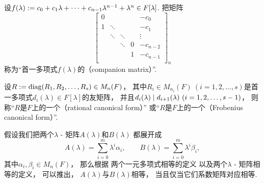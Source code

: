 \begin{definition}
设\(
	f(\lambda)
	\defeq
	c_0 + c_1 \lambda + \dotsb + c_{n-1} \lambda^{n-1} + \lambda^n
	\in F[\lambda]
\).
把矩阵\begin{equation*}
	\begin{bmatrix}
		0 &        &        &   & -c_0 \\
		1 & \ddots &        &   & -c_1 \\
		  & \ddots & \ddots &   & \vdots \\
		  &        & \ddots & 0 & -c_{n-2} \\
		  &        &        & 1 & -c_{n-1} \\
	\end{bmatrix}_n
\end{equation*}
称为“首一多项式\(f(\lambda)\)的（companion matrix）”.
\end{definition}

\begin{definition}
设\(
	R
	\defeq
	\diag(R_1,R_2,\dotsc,R_s)
	\in M_n(F)
\)，
其中\(R_i \in M_{n_i}(F)\ (i=1,2,\dotsc,s)\)是首一多项式\(d_i(\lambda) \in F[\lambda]\)的友矩阵，
并且\(\ExactlyDividedBy{ d_{i+1}(\lambda) }{ d_i(\lambda) }\ (i=1,2,\dotsc,s-1)\)，
则称“\(R\)是\(F\)上的一个（rational canonical form）”
或“\(R\)是\(F\)上的一个（Frobenius canonical form）”.
\end{definition}

假设我们把两个\(\lambda\) - 矩阵\(A(\lambda)\)和\(B(\lambda)\)
都展开成\begin{equation*}
	A(\lambda)
	= \sum_{i=0}^m \lambda^i \alpha_i,
	\qquad
	B(\lambda)
	= \sum_{i=0}^m \lambda^i \beta_i,
\end{equation*}
其中\(\alpha_i,\beta_i \in M_n(F)\)，
那么根据
两个一元多项式相等的定义
以及两个\(\lambda\) - 矩阵相等的定义，
可以推出，
\(A(\lambda)\)与\(B(\lambda)\)相等，
当且仅当它们系数矩阵对应相等.






